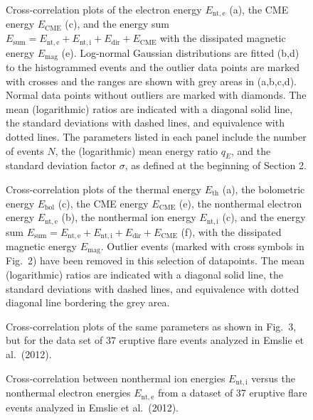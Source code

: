 \documentclass[10pt,preprint]{aastex}  %
\begin{document}
\begin{figure}
\caption{Cross-correlation plots of the electron energy $E_{\mathrm{nt,e}}$ (a), 
the CME energy $E_{\mathrm{CME}}$ (c), and the energy sum 
$E_{\mathrm{sum}}=E_{\mathrm{nt,e}}+E_{\mathrm{nt,i}}+E_{\mathrm{dir}}+E_{\mathrm{CME}}$
with the dissipated magnetic energy $E_{\mathrm{mag}}$ (e). 
Log-normal Gaussian distributions
are fitted (b,d) to the histogrammed events and the outlier data points are marked 
with crosses and the ranges are shown with grey areas in (a,b,c,d). 
Normal data points without outliers are marked with diamonds. The mean
(logarithmic) ratios are indicated with a diagonal solid line, the standard
deviations with dashed lines, and equivalence with dotted lines.
The parameters listed in each panel include the number of events $N$,
the (logarithmic) mean energy ratio $q_E$, and the standard deviation
factor $\sigma$, as defined at the beginning of Section 2.}
\end{figure}

\begin{figure}
\caption{Cross-correlation plots of 
the thermal energy $E_{\mathrm{th}}$ (a), 
the bolometric energy $E_{\mathrm{bol}}$ (c),
the CME energy $E_{\mathrm{CME}}$ (e), 
the nonthermal electron energy $E_{\mathrm{nt,e}}$ (b), 
the nonthermal ion energy $E_{\mathrm{nt,i}}$ (c), 
and the energy sum $E_{\mathrm{sum}}=E_{\mathrm{nt,e}}+E_{\mathrm{nt,i}}
+E_{\mathrm{dir}}+E_{\mathrm{CME}}$ (f),
with the dissipated magnetic energy $E_{\mathrm{mag}}$. 
Outlier events (marked with cross symbols in Fig.~2)
have been removed in this selection of datapoints.
The mean (logarithmic) ratios are indicated with a diagonal solid line, 
the standard deviations with dashed lines, and equivalence with dotted 
diagonal line bordering the grey area.}
\end{figure}

\begin{figure}
\caption{Cross-correlation plots of the same parameters as shown
in Fig.~3, but for the data set of 37 eruptive flare events 
analyzed in Emslie et al.~(2012).}
\end{figure}

\begin{figure}
\caption{Cross-correlation between nonthermal ion energies $E_{\mathrm{nt,i}}$
versus the nonthermal electron energies $E_{\mathrm{nt,e}}$ from a dataset
of 37 eruptive flare events analyzed in Emslie et al.~(2012).}
\end{figure}
\end{document}
